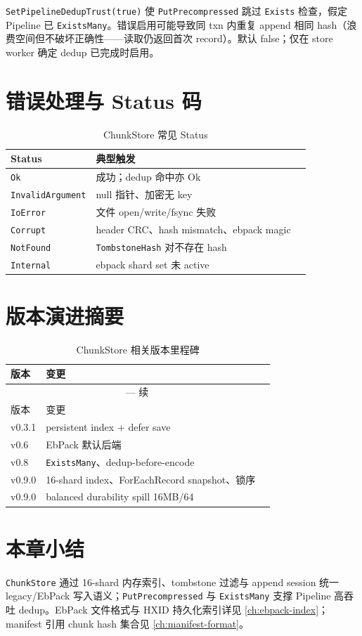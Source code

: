 \texttt{SetPipelineDedupTrust(true)} 使 \texttt{PutPrecompressed} 跳过 \texttt{Exists} 检查，假定 Pipeline 已 \texttt{ExistsMany}。错误启用可能导致同 txn 内重复 append 相同 hash（浪费空间但不破坏正确性——读取仍返回首次 record）。默认 false；仅在 store worker 确定 dedup 已完成时启用。

\section{错误处理与 Status 码}

\begin{table}[htbp]
\centering
\caption{ChunkStore 常见 Status}
\begin{tabular}{@{}llp{6cm}@{}}
\toprule
Status & 典型触发 \\
\midrule
\texttt{Ok} & 成功；dedup 命中亦 Ok \\
\texttt{InvalidArgument} & null 指针、加密无 key \\
\texttt{IoError} & 文件 open/write/fsync 失败 \\
\texttt{Corrupt} & header CRC、hash mismatch、ebpack magic \\
\texttt{NotFound} & \texttt{TombstoneHash} 对不存在 hash \\
\texttt{Internal} & ebpack shard set 未 active \\
\bottomrule
\end{tabular}
\end{table}

\section{版本演进摘要}

\begin{longtable}{@{}llp{7cm}@{}}
\caption{ChunkStore 相关版本里程碑} \\
\toprule
版本 & 变更 \\
\midrule
\endfirsthead
\multicolumn{2}{c}{\tablename\ \thetable{} — 续} \\
\toprule
版本 & 变更 \\
\midrule
\endhead
v0.3.1 & persistent index + defer save \\
v0.6 & EbPack 默认后端 \\
v0.8 & \texttt{ExistsMany}、dedup-before-encode \\
v0.9.0 & 16-shard index、ForEachRecord snapshot、锁序 \\
v0.9.0 & balanced durability spill 16MB/64 \\
\bottomrule
\end{longtable}

\section{本章小结}

\texttt{ChunkStore} 通过 16-shard 内存索引、tombstone 过滤与 append session 统一 legacy/EbPack 写入语义；\texttt{PutPrecompressed} 与 \texttt{ExistsMany} 支撑 Pipeline 高吞吐 dedup。EbPack 文件格式与 HXID 持久化索引详见 \cref{ch:ebpack-index}；manifest 引用 chunk hash 集合见 \cref{ch:manifest-format}。
